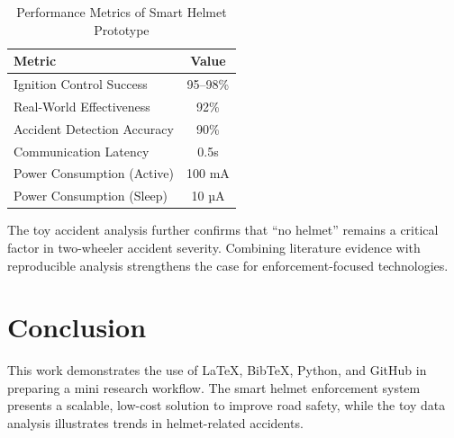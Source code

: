 \documentclass[conference]{IEEEtran}
\begin{document}
\begin{table}[h]
\centering
\caption{Performance Metrics of Smart Helmet Prototype \cite{yadav2025}}
\begin{tabular}{|l|c|}
\hline
\textbf{Metric} & \textbf{Value} \\
\hline
Ignition Control Success & 95--98\% \\
Real-World Effectiveness & 92\% \\
Accident Detection Accuracy & 90\% \\
Communication Latency & 0.5s \\
Power Consumption (Active) & 100 mA \\
Power Consumption (Sleep) & 10 µA \\
\hline
\end{tabular}
\label{tab:metrics}
\end{table}

The toy accident analysis further confirms that ``no helmet'' remains a 
critical factor in two-wheeler accident severity. Combining literature 
evidence with reproducible analysis strengthens the case for enforcement-focused 
technologies.

\section{Conclusion}
This work demonstrates the use of LaTeX, BibTeX, Python, and GitHub in preparing 
a mini research workflow. The smart helmet enforcement system presents a 
scalable, low-cost solution to improve road safety, while the toy data analysis 
illustrates trends in helmet-related accidents.



\end{document}
